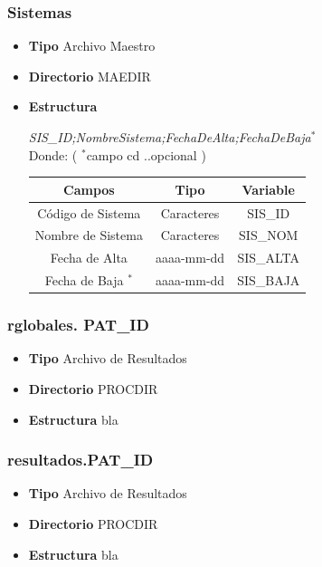 \documentclass[a4paper,10pt,titlepage]{article}
\begin{document}
		\subsubsection{Sistemas}

			\begin {itemize}
				\item \textbf{Tipo} {Archivo Maestro}
				\item \textbf{Directorio} {MAEDIR}
				\item \textbf{Estructura} {\textit{SIS\_ID;NombreSistema;FechaDeAlta;FechaDeBaja$^*$}\\
					Donde: (	$^*$campo  cd ..opcional )\ 
					\begin{table}[H]
					\centering
					\begin{tabular}{| c | c | c |}
						\hline
						Campos 	& Tipo & Variable\\
						\hline
							Código de Sistema & Caracteres & SIS\_ID \\
						\hline 
						 Nombre de Sistema & Caracteres 	& SIS\_NOM\\
						\hline
						Fecha de Alta & aaaa-mm-dd & SIS\_ALTA\\
						\hline
						Fecha de Baja $^*$& aaaa-mm-dd & SIS\_BAJA\\
						\hline
					\end{tabular}
					\end{table}
				}
			\end{itemize}

		\subsubsection{rglobales. PAT\_ID}

			\begin {itemize}
				\item \textbf{Tipo} {Archivo de Resultados}
				\item \textbf{Directorio} {PROCDIR}
				\item \textbf{Estructura} {bla}
			\end{itemize}

		\subsubsection{resultados.PAT\_ID}

			\begin {itemize}
				\item \textbf{Tipo} {Archivo de Resultados}
				\item \textbf{Directorio} {PROCDIR}
				\item \textbf{Estructura} {bla}
			\end{itemize}
	
\end{document}
